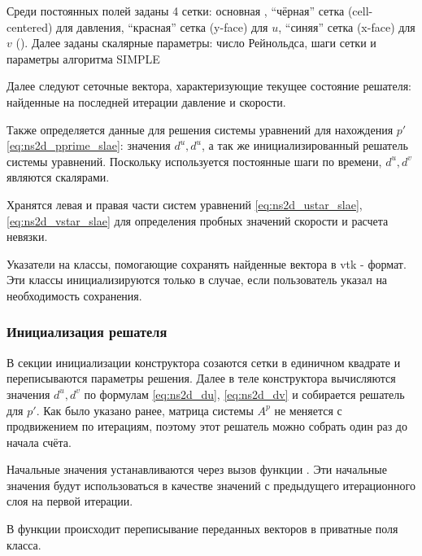 Среди постоянных полей заданы 4 сетки: основная ,
``чёрная'' сетка  (cell-centered) для давления,
``красная'' сетка  (y-face) для $u$,
``синяя'' сетка  (x-face) для $v$ ().
Далее заданы скалярные параметры: число Рейнольдса, шаги сетки и параметры алгоритма SIMPLE

Далее следуют сеточные вектора, характеризующие текущее состояние решателя:
найденные на последней итерации давление и скорости.

Также определяется данные для решения системы уравнений для нахождения $p'$ \eqref{eq:ns2d_pprime_slae}:
значения $d^u, d^u$, а так же инициализированный решатель системы уравнений.
Поскольку используется постоянные шаги по времени, $d^u, d^v$ являются скалярами.

Хранятся левая и правая части систем уравнений \eqref{eq:ns2d_ustar_slae}, \eqref{eq:ns2d_vstar_slae}
для определения пробных значений скорости и расчета невязки.

Указатели на классы, помогающие сохранять найденные вектора в vtk - формат.
Эти классы инициализируются только в случае, если пользователь указал на 
необходимость сохранения.

\subsubsection{Инициализация решателя}

В секции инициализации конструктора
созаются сетки в единичном квадрате и переписываются параметры решения.
Далее в теле конструктора вычисляются значения
$d^u, d^v$ по формулам \eqref{eq:ns2d_du}, \eqref{eq:ns2d_dv}
и собирается решатель для $p'$. Как было указано ранее,
матрица системы $A^p$ не меняется
с продвижением по итерациям, поэтому этот решатель можно собрать один раз
до начала счёта.


Начальные значения устанавливаются через вызов функции .
Эти начальные значения будут использоваться в качестве значений
с предыдущего итерационного слоя на первой итерации.

В функции происходит переписывание переданных векторов
в приватные поля класса.

